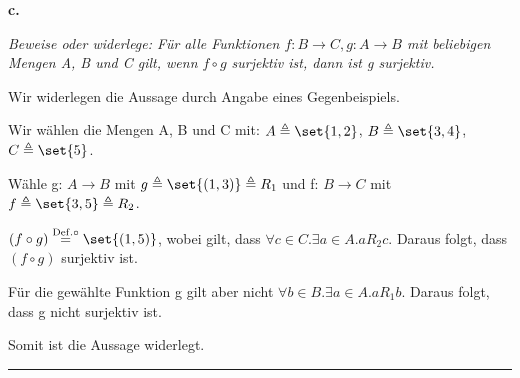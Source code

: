 \documentclass[10pt,leqno ]{article}
\DeclarePairedDelimiter\set\{\}
\newcommand\customeq[1]{\overset{\mathrm{#1}}{=}}
\theoremstyle{definition}
\newenvironment{solution}[1][L]{\begin{doublespace}\textbf{#1.}\quad }{\ \rule{0.5em}{0.5em}\end{doublespace}}
\begin{document}
\begin{solution}[c]

\textit{Beweise oder widerlege: Für alle Funktionen \(f: B \rightarrow C, g: A \rightarrow B\) mit beliebigen Mengen A, B und C gilt, wenn \(f \circ g\) surjektiv ist, dann ist g surjektiv.}

Wir widerlegen die Aussage durch Angabe eines Gegenbeispiels.

Wir wählen die Mengen A, B und C mit: \(A \triangleq \set{1,2}\), \(B \triangleq \set{3,4}\), \(C \triangleq \set{5}\).

Wähle g: \(A \rightarrow B\) mit \(g \triangleq \set{(1,3)} \triangleq R_1\) und f: \(B \rightarrow C\) mit \(f \triangleq \set{3,5} \triangleq R_2\).

\((f \circ g) \customeq{Def. \circ} \set{(1,5)}\), wobei gilt, dass \(\forall c \in C . \exists a \in A . aR_2c\). Daraus folgt, dass \((f \circ g)\) surjektiv ist.

Für die gewählte Funktion g gilt aber nicht \(\forall b \in B . \exists a \in A . aR_1b\). Daraus folgt, dass g nicht surjektiv ist.

Somit ist die Aussage widerlegt.
\end{solution}
\end{document}
